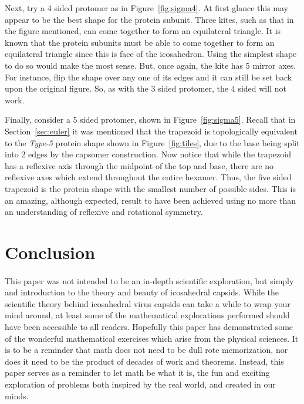 \documentclass[12pt,letter]{article}
\begin{document}
Next, try a 4 sided protomer as in Figure~\ref{fig:sigma4}. At first glance this may appear to be the best shape for the protein subunit. Three kites, such as that in the figure mentioned, can come together to form an equilateral triangle. It is known that the protein subunits must be able to come together to form an equilateral triangle since this is face of the icosahedron. Using the simplest shape to do so would make the most sense. But, once again, the kite has 5 mirror axes. For instance, flip the shape over any one of its edges and it can still be set back upon the original figure. So, as with the 3 sided protomer, the 4 sided will not work.

Finally, consider a 5 sided protomer, shown in Figure~\ref{fig:sigma5}. Recall that in Section~\ref{sec:euler} it was mentioned that the trapezoid is topologically equivalent to the \textit{Type-5} protein shape shown in Figure~\ref{fig:tiles}, due to the base being split into 2 edges by the capsomer construction. Now notice that while the trapezoid has a reflexive axis through the midpoint of the top and base, there are no reflexive axes which extend throughout the entire hexamer. Thus, the five sided trapezoid is the protein shape with the smallest number of possible sides. This is an amazing, although expected, result to have been achieved using no more than an understanding of reflexive and rotational symmetry. 

\section{Conclusion}
\paragraph{}
This paper was not intended to be an in-depth scientific exploration, but simply and introduction to the theory and beauty of icosahedral capsids. While the scientific theory behind icosahedral virus capsids can take a while to wrap your mind around, at least some of the mathematical explorations performed should have been accessible to all readers. Hopefully this paper has demonstrated some of the wonderful mathematical exercises which arise from the physical sciences. It is to be a reminder that math does not need to be dull rote memorization, nor does it need to be the product of decades of work and theorems. Instead, this paper serves as a reminder to let math be what it is, the fun and exciting exploration of problems both inspired by the real world, and created in our minds.

\newpage


\end{document}
